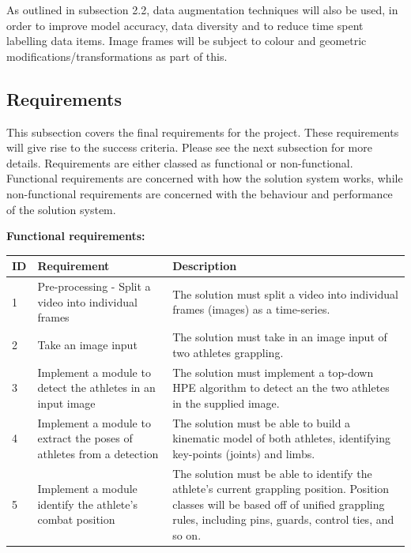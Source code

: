 \documentclass[a4paper, oneside, 11pt]{article}
\begin{document}
As outlined in subsection 2.2, data augmentation techniques will also be used, in order to improve model accuracy, data diversity and to reduce time spent labelling data items. Image frames will be subject to colour and geometric modifications/transformations as part of this.

\subsection{Requirements}

This subsection covers the final requirements for the project. These requirements will give rise to the success criteria. Please see the next subsection for more details. Requirements are either classed as functional or non-functional. Functional requirements are concerned with how the solution system works, while non-functional requirements are concerned with the behaviour and performance of the solution system.

\textbf{Functional requirements:}
\begin{center}
    \begin{tabular}{|p{4mm}|p{50mm}|p{100mm}|}
    \hline
    \textbf{ID} & \textbf{Requirement} & \textbf{Description} \\
    \hline
    \hline
    1 & Pre-processing - Split a video into individual frames & The solution must split a video into individual frames (images) as a time-series. \\
    \hline
    2 & Take an image input & The solution must take in an image input of two athletes grappling. \\
    \hline
    3 & Implement a module to detect the athletes in an input image & The solution must implement a top-down HPE algorithm to detect an the two athletes in the supplied image. \\
    \hline
    4 & Implement a module to extract the poses of athletes from a detection & The solution must be able to build a kinematic model of both athletes, identifying key-points (joints) and limbs. \\
    \hline
    5 & Implement a module identify the athlete's combat position & The solution must be able to identify the athlete's current grappling position. Position classes will be based off of unified grappling rules, including pins, guards, control ties, and so on. \\
    \hline
    \end{tabular}
\end{center}
\end{document}
